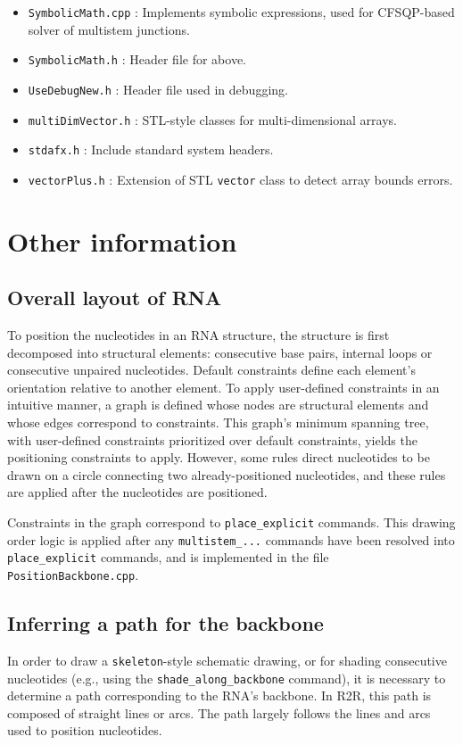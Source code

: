 \documentclass[letterpaper,12pt]{report}
\begin{document}
\begin{itemize}
\item {\tt SymbolicMath.cpp} : Implements symbolic expressions, used for CFSQP-based solver of multistem junctions.
\item {\tt SymbolicMath.h} : Header file for above.
\item {\tt UseDebugNew.h} : Header file used in debugging.
\item {\tt multiDimVector.h} : STL-style classes for multi-dimensional arrays.
\item {\tt stdafx.h} : Include standard system headers.
\item {\tt vectorPlus.h} : Extension of STL {\tt vector} class to detect array bounds errors.
\end{itemize}

\section{Other information}

\subsection{Overall layout of RNA}

To position the nucleotides in an RNA structure, the structure is first decomposed into structural elements: consecutive base pairs, internal loops or consecutive unpaired nucleotides. Default constraints define each element's orientation relative to another element. To apply user-defined constraints in an intuitive manner, a graph is defined whose nodes are structural elements and whose edges correspond to constraints. This graph's minimum spanning tree, with user-defined constraints prioritized over default constraints, yields the positioning constraints to apply. However, some rules direct nucleotides to be drawn on a circle connecting two already-positioned nucleotides, and these rules are applied after the nucleotides are positioned.

Constraints in the graph correspond to {\tt place\_explicit} commands.
This drawing order logic is applied after any {\tt multistem\_...} commands have been resolved into {\tt place\_explicit} commands, and is implemented in the file
{\tt PositionBackbone.cpp}.

\subsection{Inferring a path for the backbone}

In order to draw a {\tt skeleton}-style schematic drawing, or for shading consecutive nucleotides (e.g., using the {\tt shade\_along\_backbone} command), it is necessary to determine a path corresponding to the RNA's backbone. In R2R, this path is composed of straight lines or arcs. The path largely follows the lines and arcs used to position nucleotides.
\end{document}
